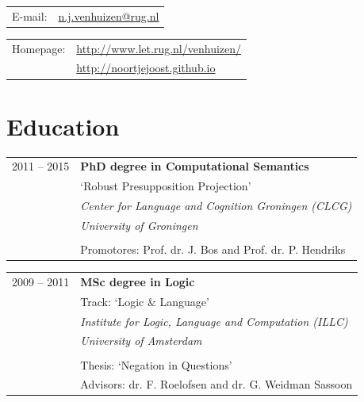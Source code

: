 \documentclass[a4paper,10pt]{article}
\def\leftcolwidth{.15\textwidth}
\def\tablevspace{10pt}
\begin{document}
\vspace{\tablevspace}

\noindent
\begin{tabularx}{\textwidth}{ p{\leftcolwidth} X }
  E-mail:         &         \href{mailto:n.j.venhuizen@rug.nl}{n.j.venhuizen@rug.nl}\\
\end{tabularx}

\vspace{\tablevspace}

\noindent
\begin{tabularx}{\textwidth}{ p{\leftcolwidth} X }
  Homepage:       &       \url{http://www.let.rug.nl/venhuizen/}\\
                  &       \url{http://noortjejoost.github.io}
\end{tabularx}



\section*{Education}

\noindent
\begin{tabularx}{\textwidth}{ p{\leftcolwidth} X }
  2011 -- 2015
  & \textbf{PhD degree in Computational Semantics}\\
  & `Robust Presupposition Projection'\\
  & \textit{Center for Language and Cognition Groningen (CLCG)}\\
  & \textit{University of Groningen}\\
  & \\
  & Promotores: Prof. dr. J. Bos and Prof. dr. P. Hendriks
\end{tabularx}

\vspace{\tablevspace}

\noindent
\begin{tabularx}{\textwidth}{ p{\leftcolwidth} X }
  2009 -- 2011  
  & \textbf{MSc degree in Logic}\\
  & Track: `Logic \& Language'\\
  & \textit{Institute for Logic, Language and Computation (ILLC)}\\
  & \textit{University of Amsterdam}\\
  & \\
  & Thesis: `Negation in Questions'\\
  & Advisors: dr. F. Roelofsen and dr. G. Weidman Sassoon\\
\end{tabularx}
\end{document}
